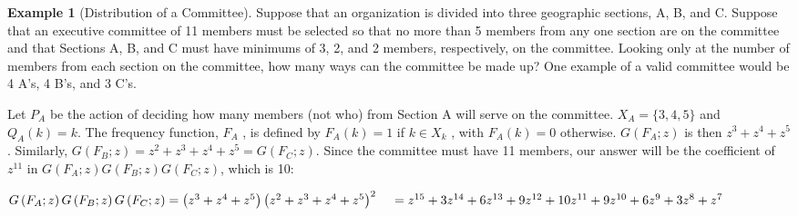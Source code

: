 \documentclass[10pt,]{book}
\theoremstyle{plain}
\theoremstyle{definition}
\theoremstyle{definition}
\theoremstyle{definition}
\newtheorem{example}[theorem]{Example}
\theoremstyle{definition}
\numberwithin{equation}{section}
\begin{document}
\begin{example}[Distribution of a Committee]\label{ex-committee-distribution}
Suppose that an organization is divided into three geographic sections, A, B, and C. Suppose that an executive committee of
11 members must be selected so that no more than 5 members from any one section are on the committee and that Sections A, B, and C must have minimums
of 3, 2, and 2 members, respectively, on the committee. Looking only at the number of members from each section on the committee, how many ways can
the committee be made up? One example of a valid committee would be 4 A's, 4 B's, and 3 C's.



Let \(P_A\) be the action of deciding how many members (not who) from Section A will serve on the committee. \(X_A= \{3, 4, 5\}\) and \(Q_A(k)=k\).
{ }The frequency function, \(F_A\) , is defined by \(F_A(k)=1\) if \(k\in X_k\) , with \(F_A(k)=0\) otherwise. \(G\left(F_A;z\right)\) is then \(z^3+
z^4+z^5\) . Similarly, \(G\left(F_B;z\right) =z^2+ z^3+ z ^4 + z^5= G\left(F_C ;z\right)\). Since the committee must have 11 members, our answer
will be the coefficient of \(z^{11}\) in \(G\left(F_A;z\right)G\left(F_B;z\right)G\left(F_C;z\right)\), which is 10:



\(G\left(F_A;z\right)G\left(F_B;z\right)G\left(F_C;z\right)=\left(z^3+ z^4+z^5\right)\left(z^2+ z^3+ z ^4 + z^5\right)^2\\
\\
\quad =z^{15}+3 z^{14}+6 z^{13}+9 z^{12}+10 z^{11}+9 z^{10}+6 z^9+3 z^8+z^7\)%
\end{example}
\typeout{************************************************}
\typeout{************************************************}
\end{document}
